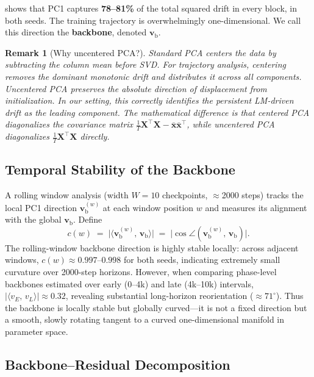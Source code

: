 \documentclass[11pt,a4paper]{article}
\newcommand{\vb}{\mathbf{v}_{\mathrm{b}}}
\newcommand{\inner}[2]{\langle #1,\, #2 \rangle}
\newcommand{\abs}[1]{\lvert #1 \rvert}
\newtheorem{remark}{Remark}
\begin{document}
 shows that PC1 captures \textbf{78--81\%} of the
total squared drift in every block, in both seeds.  The training trajectory is
overwhelmingly one-dimensional.  We call this direction the
\textbf{backbone}, denoted $\vb$.

\begin{remark}[Why uncentered PCA?]
Standard PCA centers the data by subtracting the column mean before SVD.  For
trajectory analysis, centering removes the dominant monotonic drift and
distributes it across all components.  Uncentered PCA preserves the absolute
direction of displacement from initialization.  In our setting, this correctly
identifies the persistent LM-driven drift as the leading component.  The
mathematical difference is that centered PCA diagonalizes the covariance matrix
$\frac{1}{T}\mathbf{X}^{\!\top}\mathbf{X} - \bar{\mathbf{x}}\bar{\mathbf{x}}^{\!\top}$,
while uncentered PCA diagonalizes
$\frac{1}{T}\mathbf{X}^{\!\top}\mathbf{X}$ directly.
\end{remark}

\subsection{Temporal Stability of the Backbone}\label{sec:stability}

A rolling window analysis (width $W = 10$ checkpoints, $\approx$2000 steps)
tracks the local PC1 direction $\vb^{(w)}$ at each window position $w$ and
measures its alignment with the global $\vb$.  Define
\begin{equation}\label{eq:rolling-cos}
    c(w) \;=\; \abs{\inner{\vb^{(w)}}{\vb}}
    \;=\; \abs{\cos\angle(\vb^{(w)},\,\vb)}.
\end{equation}
The rolling-window backbone direction is highly stable locally: across adjacent
windows, $c(w) \approx 0.997$--$0.998$ for both seeds, indicating extremely
small curvature over 2000-step horizons.  However, when comparing phase-level
backbones estimated over early (0--4k) and late (4k--10k) intervals,
$\abs{\inner{v_E}{v_L}} \approx 0.32$, revealing substantial long-horizon
reorientation ($\approx 71^{\circ}$).  Thus the backbone is locally stable but
globally curved---it is not a fixed direction but a smooth, slowly rotating
tangent to a curved one-dimensional manifold in parameter space.

\subsection{Backbone--Residual Decomposition}\label{sec:decomposition}
\end{document}
